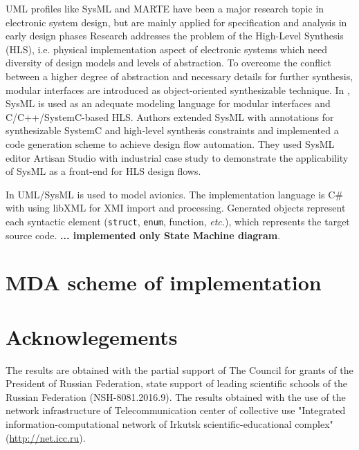 \documentclass{llncs}
\begin{document}
UML profiles like SysML and MARTE have been a major research topic in electronic system design, but are mainly applied for specification and analysis in early design phases Research \cite{mish} addresses the problem of the High-Level Synthesis (HLS), i.e. physical implementation aspect of electronic systems which need diversity of design models and levels of abstraction.  To overcome the conflict between a higher degree of abstraction and necessary details for further synthesis, modular interfaces are introduced as object-oriented synthesizable technique. In \cite{mish},  SysML is used as an adequate modeling language for modular interfaces and C/C++/SystemC-based HLS. Authors extended SysML with annotations for synthesizable SystemC and high-level synthesis constraints and implemented a code generation scheme to achieve design flow automation. They used SysML editor Artisan Studio with industrial case study to demonstrate the applicability of SysML as a front-end for HLS design flows.

In \cite{tom16} UML/SysML is used to model avionics.  The implementation language is C\# with using libXML for XMI import and processing.  Generated objects represent each syntactic element (\texttt{struct}, \texttt{enum}, function, \emph{etc.}), which represents the target source code.  \textbf{... implemented only State Machine diagram}.

\cite{fab}



\section{MDA scheme of implementation}
\label{sec:mda-impl-scheme}




\section{Acknowlegements}
\label{sec:acks}

The results are obtained with the partial support of The Council for grants of the President of Russian Federation, state support of leading scientific schools of the Russian Federation (NSH-8081.2016.9). The results obtained with the use of the network infrastructure of Telecommunication center of collective use "Integrated information-computational network of Irkutsk scientific-educational complex" (\url{http://net.icc.ru}).
\end{document}
